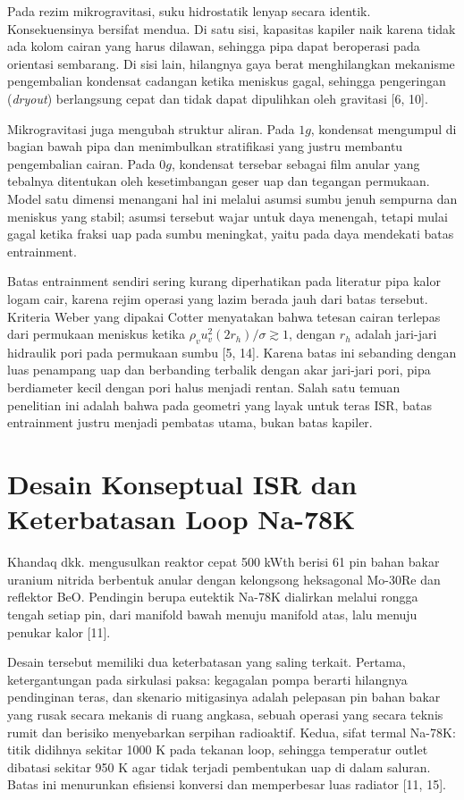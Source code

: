 \documentclass[
  indonesian,
  12pt,
  a4paper,
]{report}
\begin{document}
Pada rezim mikrogravitasi, suku hidrostatik lenyap secara identik.
Konsekuensinya bersifat mendua. Di satu sisi, kapasitas kapiler naik
karena tidak ada kolom cairan yang harus dilawan, sehingga pipa dapat
beroperasi pada orientasi sembarang. Di sisi lain, hilangnya gaya berat
menghilangkan mekanisme pengembalian kondensat cadangan ketika meniskus
gagal, sehingga pengeringan (\emph{dryout}) berlangsung cepat dan tidak
dapat dipulihkan oleh gravitasi {[}6, 10{]}.

Mikrogravitasi juga mengubah struktur aliran. Pada \(1g\), kondensat
mengumpul di bagian bawah pipa dan menimbulkan stratifikasi yang justru
membantu pengembalian cairan. Pada \(0g\), kondensat tersebar sebagai
film anular yang tebalnya ditentukan oleh kesetimbangan geser uap dan
tegangan permukaan. Model satu dimensi menangani hal ini melalui asumsi
sumbu jenuh sempurna dan meniskus yang stabil; asumsi tersebut wajar
untuk daya menengah, tetapi mulai gagal ketika fraksi uap pada sumbu
meningkat, yaitu pada daya mendekati batas entrainment.

Batas entrainment sendiri sering kurang diperhatikan pada literatur pipa
kalor logam cair, karena rejim operasi yang lazim berada jauh dari batas
tersebut. Kriteria Weber yang dipakai Cotter menyatakan bahwa tetesan
cairan terlepas dari permukaan meniskus ketika
\(\rho_v u_v^2 (2 r_h) / \sigma \gtrsim 1\), dengan \(r_h\) adalah
jari-jari hidraulik pori pada permukaan sumbu {[}5, 14{]}. Karena batas
ini sebanding dengan luas penampang uap dan berbanding terbalik dengan
akar jari-jari pori, pipa berdiameter kecil dengan pori halus menjadi
rentan. Salah satu temuan penelitian ini adalah bahwa pada geometri yang
layak untuk teras ISR, batas entrainment justru menjadi pembatas utama,
bukan batas kapiler.

\section{Desain Konseptual ISR dan Keterbatasan Loop
Na-78K}\label{desain-konseptual-isr-dan-keterbatasan-loop-na-78k}

Khandaq dkk. mengusulkan reaktor cepat 500 kWth berisi 61 pin bahan
bakar uranium nitrida berbentuk anular dengan kelongsong heksagonal
Mo-30Re dan reflektor BeO. Pendingin berupa eutektik Na-78K dialirkan
melalui rongga tengah setiap pin, dari manifold bawah menuju manifold
atas, lalu menuju penukar kalor {[}11{]}.

Desain tersebut memiliki dua keterbatasan yang saling terkait. Pertama,
ketergantungan pada sirkulasi paksa: kegagalan pompa berarti hilangnya
pendinginan teras, dan skenario mitigasinya adalah pelepasan pin bahan
bakar yang rusak secara mekanis di ruang angkasa, sebuah operasi yang
secara teknis rumit dan berisiko menyebarkan serpihan radioaktif. Kedua,
sifat termal Na-78K: titik didihnya sekitar 1000 K pada tekanan loop,
sehingga temperatur outlet dibatasi sekitar 950 K agar tidak terjadi
pembentukan uap di dalam saluran. Batas ini menurunkan efisiensi
konversi dan memperbesar luas radiator {[}11, 15{]}.
\end{document}
